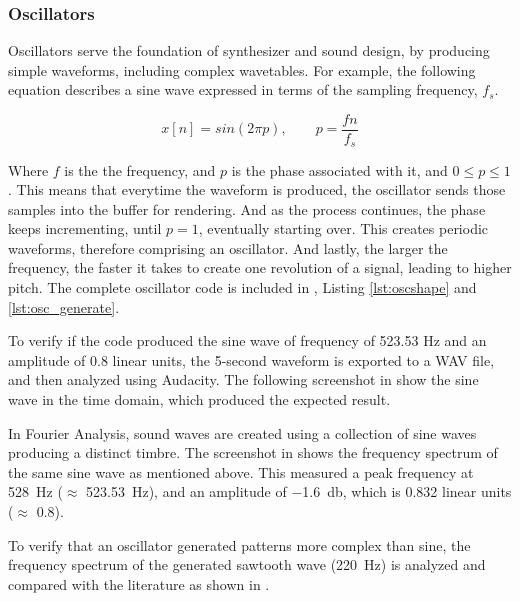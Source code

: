 \subsubsection{Oscillators}

Oscillators serve the foundation of synthesizer and sound design, by producing
simple waveforms, including complex wavetables. For example, the following equation describes a sine wave
expressed in terms of the sampling frequency, $f_s$.

\begin{equation}\label{eq:osc_basic_sine}
    x[n] = sin(2 \pi p),   \qquad  p = \frac{f n}{f_s}
\end{equation}

Where $f$ is the the frequency, and $p$ is the phase associated with it, and $0 \leq p \leq 1$.
This means that everytime the waveform is produced, the oscillator sends those samples into the
buffer for rendering. And as the process continues, the phase keeps incrementing, until $p = 1$, eventually
starting over. This creates periodic waveforms, therefore comprising an oscillator. And lastly, the larger
the frequency, the faster it takes to create one revolution of a signal, leading to higher pitch. The complete 
oscillator code is included in , Listing \ref{lst:oscshape} and \ref{lst:osc_generate}.

To verify if the code produced the sine wave of frequency of 523.53 Hz and an amplitude of 0.8 linear units, 
the 5-second waveform is exported to a WAV file, and then analyzed using Audacity. The following screenshot 
in  show the sine wave in the time domain, which produced the expected result.



In Fourier Analysis, sound waves are created using a collection of sine waves producing a distinct
timbre. The screenshot in  shows the frequency spectrum of the same sine 
wave as mentioned above. This measured a peak frequency at \SI{528}{\hertz} ($\approx$ \SI{523.53}{\hertz}), 
and an amplitude of \SI{-1.6}{\decibel}, which is 0.832 linear units ($\approx$ 0.8).



To verify that an oscillator generated patterns more complex than sine, the frequency spectrum
of the generated sawtooth wave (\SI{220}{Hz}) is analyzed and compared with the literature 
\cite{wilczek2022waveforms} as shown in .


